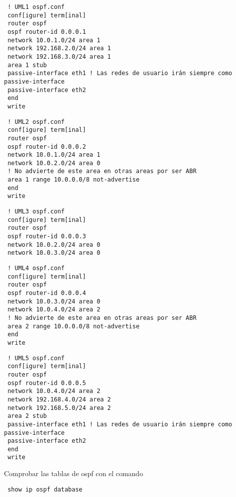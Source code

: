\begin{verbatim}
 ! UML1 ospf.conf
 conf[igure] term[inal]
 router ospf
 ospf router-id 0.0.0.1
 network 10.0.1.0/24 area 1
 network 192.168.2.0/24 area 1
 network 192.168.3.0/24 area 1
 area 1 stub
 passive-interface eth1 ! Las redes de usuario irán siempre como passive-interface
 passive-interface eth2
 end
 write
\end{verbatim}

\begin{verbatim}
 ! UML2 ospf.conf
 conf[igure] term[inal]
 router ospf
 ospf router-id 0.0.0.2
 network 10.0.1.0/24 area 1
 network 10.0.2.0/24 area 0
 ! No advierte de este area en otras areas por ser ABR
 area 1 range 10.0.0.0/8 not-advertise
 end
 write
\end{verbatim}

\begin{verbatim}
 ! UML3 ospf.conf
 conf[igure] term[inal]
 router ospf
 ospf router-id 0.0.0.3
 network 10.0.2.0/24 area 0
 network 10.0.3.0/24 area 0

\end{verbatim}

\begin{verbatim}
 ! UML4 ospf.conf
 conf[igure] term[inal]
 router ospf
 ospf router-id 0.0.0.4
 network 10.0.3.0/24 area 0
 network 10.0.4.0/24 area 2
 ! No advierte de este area en otras areas por ser ABR
 area 2 range 10.0.0.0/8 not-advertise
 end
 write
\end{verbatim}

\begin{verbatim}
 ! UML5 ospf.conf
 conf[igure] term[inal]
 router ospf
 ospf router-id 0.0.0.5
 network 10.0.4.0/24 area 2
 network 192.168.4.0/24 area 2
 network 192.168.5.0/24 area 2
 area 2 stub
 passive-interface eth1 ! Las redes de usuario irán siempre como passive-interface
 passive-interface eth2
 end
 write
\end{verbatim}

Comprobar las tablas de ospf con el comando

\begin{verbatim}
 show ip ospf database
\end{verbatim}